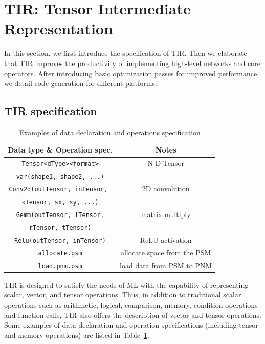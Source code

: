 \section{TIR: Tensor Intermediate Representation}\label{sec:mlir}


In this section, we first introduce the specification of TIR. Then we elaborate that TIR improves the productivity of implementing high-level networks and core operators. After introducing basic optimization passes for improved performance, we detail code generation for different platforms.

\subsection{TIR specification}

\begin{table}[b]
  \centering
  \scriptsize
\caption{\footnotesize Examples of data declaration and operations specification}
  \label{tab:tir}
  \begin{tabular}{cc}
    \toprule
Data type \& Operation spec. & Notes\\
    \midrule
\texttt{Tensor<dType><format>} & N-D Tensor\\
\texttt{var(shape1, shape2, ...)} & \\
    \midrule
\texttt{Conv2d(outTensor, inTensor, } & 2D convolution \\
\texttt{kTensor, sx, sy, ...)}& \\
    \midrule
\texttt{Gemm(outTensor, lTensor,} & matrix multiply\\
\texttt{rTensor, tTensor)} &\\
    \midrule
\texttt{Relu(outTensor, inTensor)} & ReLU activation\\
    \midrule
\texttt{allocate.psm} & allocate space from the PSM\\
    \midrule
\texttt{load.pnm.psm} & load data from PSM to PNM\\
    \bottomrule
  \end{tabular}
\end{table}

TIR is designed to satisfy the needs of ML with the capability of representing scalar, vector, and tensor operations. Thus, in addition to traditional scalar operations such as arithmetic, logical, comparison, memory, condition operations and function calls, TIR also offers the description of vector and tensor operations. Some examples of data declaration and operation specifications (including tensor and memory operations) are listed in Table~\ref{tab:tir}.

